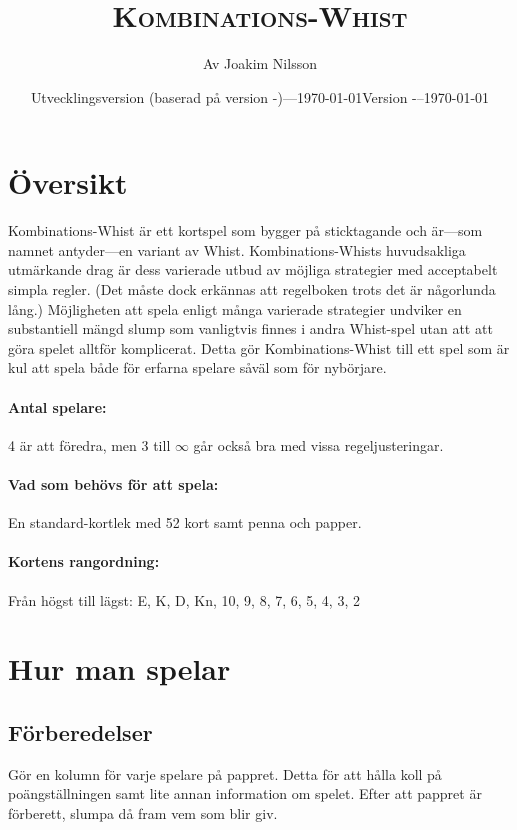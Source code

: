 \documentclass[a4paper]{article}
\title{\textsc{Kombinations-Whist}}
\author{Av Joakim Nilsson}
\date{Utvecklingsversion (baserad på version \varVersion-\varLanguage)---\today}
\date{Version \varVersion-\varLanguage\---\today}
\begin{document}
	\introPages

	\noindent

	\pagebreak

	\section{Översikt}
		Kombinations-Whist är ett kortspel som bygger på sticktagande och är---som namnet antyder---en variant av Whist. Kombinations-Whists huvudsakliga utmärkande drag är dess varierade utbud av möjliga strategier med acceptabelt simpla regler. (Det måste dock erkännas att regelboken trots det är någorlunda lång.) Möjligheten att spela enligt många varierade strategier undviker en substantiell mängd slump som vanligtvis finnes i andra Whist-spel utan att att göra spelet alltför komplicerat. Detta gör Kombinations-Whist till ett spel som är kul att spela både för erfarna spelare såväl som för nybörjare.

		\paragraph{Antal spelare:}
		4 är att föredra, men 3 till $\infty$ går också bra med vissa regeljusteringar.

		\paragraph{Vad som behövs för att spela:}
		En standard-kortlek med 52 kort samt penna och papper.

		\paragraph{Kortens rangordning:}
		Från högst till lägst: E, K, D, Kn, 10, 9, 8, 7, 6, 5, 4, 3, 2

	\section{Hur man spelar}
		\subsection{Förberedelser}
			Gör en kolumn för varje spelare på pappret. Detta för att hålla koll på poängställningen samt lite annan information om spelet. Efter att pappret är förberett, slumpa då fram vem som blir giv.
\end{document}
